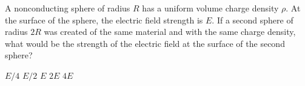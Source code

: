 \begin{questions}\setcounter{question}{8}\question
A nonconducting sphere of radius $R$ has a uniform volume charge density $\rho$. At the surface of the sphere, the electric field strength is $E$. If a second sphere of radius $2 R$ was created of the same material and with the same charge density, what would be the strength of the electric field at the surface of the second sphere?

\begin{oneparchoices}
\choice $E / 4$
\choice $E / 2$
\choice $E$
\choice $2 E$
\choice $4 E$
\end{oneparchoices}\end{questions}
